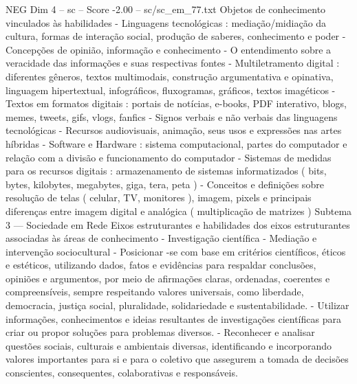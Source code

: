 \begin{textsample}{NEG Dim 4 – sc – Score -2.00 – sc/sc\_em\_77.txt}
Objetos de conhecimento vinculados às habilidades - Linguagens tecnológicas : mediação/midiação da cultura, formas de interação social, produção de saberes, conhecimento e poder - Concepções de opinião, informação e conhecimento - O entendimento sobre a veracidade das informações e suas respectivas fontes - Multiletramento digital : diferentes gêneros, textos multimodais, construção argumentativa e opinativa, linguagem hipertextual, infográficos, fluxogramas, gráficos, textos imagéticos - Textos em formatos digitais : portais de notícias, e-books, PDF interativo, blogs, memes, tweets, gifs, vlogs, fanfics - Signos verbais e não verbais das linguagens tecnológicas - Recursos audiovisuais, animação, seus usos e expressões nas artes híbridas - Software e Hardware : sistema computacional, partes do computador e relação com a divisão e funcionamento do computador - Sistemas de medidas para os recursos digitais : armazenamento de sistemas informatizados ( bits, bytes, kilobytes, megabytes, giga, tera, peta ) - Conceitos e definições sobre resolução de telas ( celular, TV, monitores ), imagem, pixels e principais diferenças entre imagem digital e analógica ( multiplicação de matrizes ) Subtema 3 — Sociedade em Rede Eixos estruturantes e habilidades dos eixos estruturantes associadas às áreas de conhecimento - Investigação científica - Mediação e intervenção sociocultural - Posicionar -se com base em critérios científicos, éticos e estéticos, utilizando dados, fatos e evidências para respaldar conclusões, opiniões e argumentos, por meio de afirmações claras, ordenadas, coerentes e compreensíveis, sempre respeitando valores universais, como liberdade, democracia, justiça social, pluralidade, solidariedade e sustentabilidade. - Utilizar informações, conhecimentos e ideias resultantes de investigações científicas para criar ou propor soluções para problemas diversos. - Reconhecer e analisar questões sociais, culturais e ambientais diversas, identificando e incorporando valores importantes para si e para o coletivo que assegurem a tomada de decisões conscientes, consequentes, colaborativas e responsáveis.

\end{textsample}
